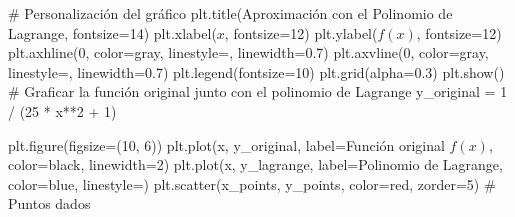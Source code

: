 \documentclass[
  letterpaper,
  DIV=11,
  numbers=noendperiod]{scrartcl}
\newenvironment{Shaded}{\begin{snugshade}}{\end{snugshade}}
\newcommand{\CommentTok}[1]{\textcolor[rgb]{0.37,0.37,0.37}{#1}}
\newcommand{\DecValTok}[1]{\textcolor[rgb]{0.68,0.00,0.00}{#1}}
\newcommand{\FloatTok}[1]{\textcolor[rgb]{0.68,0.00,0.00}{#1}}
\newcommand{\NormalTok}[1]{\textcolor[rgb]{0.00,0.23,0.31}{#1}}
\newcommand{\OperatorTok}[1]{\textcolor[rgb]{0.37,0.37,0.37}{#1}}
\newcommand{\StringTok}[1]{\textcolor[rgb]{0.13,0.47,0.30}{#1}}
\begin{document}
\begin{Shaded}
\begin{Highlighting}[]
\CommentTok{\# Personalización del gráfico}
\NormalTok{plt.title(}\StringTok{\textquotesingle{}Aproximación con el Polinomio de Lagrange\textquotesingle{}}\NormalTok{, fontsize}\OperatorTok{=}\DecValTok{14}\NormalTok{)}
\NormalTok{plt.xlabel(}\StringTok{\textquotesingle{}$x$\textquotesingle{}}\NormalTok{, fontsize}\OperatorTok{=}\DecValTok{12}\NormalTok{)}
\NormalTok{plt.ylabel(}\StringTok{\textquotesingle{}$f(x)$\textquotesingle{}}\NormalTok{, fontsize}\OperatorTok{=}\DecValTok{12}\NormalTok{)}
\NormalTok{plt.axhline(}\DecValTok{0}\NormalTok{, color}\OperatorTok{=}\StringTok{\textquotesingle{}gray\textquotesingle{}}\NormalTok{, linestyle}\OperatorTok{=}\StringTok{\textquotesingle{}{-}{-}\textquotesingle{}}\NormalTok{, linewidth}\OperatorTok{=}\FloatTok{0.7}\NormalTok{)}
\NormalTok{plt.axvline(}\DecValTok{0}\NormalTok{, color}\OperatorTok{=}\StringTok{\textquotesingle{}gray\textquotesingle{}}\NormalTok{, linestyle}\OperatorTok{=}\StringTok{\textquotesingle{}{-}{-}\textquotesingle{}}\NormalTok{, linewidth}\OperatorTok{=}\FloatTok{0.7}\NormalTok{)}
\NormalTok{plt.legend(fontsize}\OperatorTok{=}\DecValTok{10}\NormalTok{)}
\NormalTok{plt.grid(alpha}\OperatorTok{=}\FloatTok{0.3}\NormalTok{)}
\NormalTok{plt.show()}
\CommentTok{\# Graficar la función original junto con el polinomio de Lagrange}
\NormalTok{y\_original }\OperatorTok{=} \DecValTok{1} \OperatorTok{/}\NormalTok{ (}\DecValTok{25} \OperatorTok{*}\NormalTok{ x}\OperatorTok{**}\DecValTok{2} \OperatorTok{+} \DecValTok{1}\NormalTok{)}

\NormalTok{plt.figure(figsize}\OperatorTok{=}\NormalTok{(}\DecValTok{10}\NormalTok{, }\DecValTok{6}\NormalTok{))}
\NormalTok{plt.plot(x, y\_original, label}\OperatorTok{=}\StringTok{\textquotesingle{}Función original $f(x)$\textquotesingle{}}\NormalTok{, color}\OperatorTok{=}\StringTok{\textquotesingle{}black\textquotesingle{}}\NormalTok{, linewidth}\OperatorTok{=}\DecValTok{2}\NormalTok{)}
\NormalTok{plt.plot(x, y\_lagrange, label}\OperatorTok{=}\StringTok{\textquotesingle{}Polinomio de Lagrange\textquotesingle{}}\NormalTok{, color}\OperatorTok{=}\StringTok{\textquotesingle{}blue\textquotesingle{}}\NormalTok{, linestyle}\OperatorTok{=}\StringTok{\textquotesingle{}{-}{-}\textquotesingle{}}\NormalTok{)}
\NormalTok{plt.scatter(x\_points, y\_points, color}\OperatorTok{=}\StringTok{\textquotesingle{}red\textquotesingle{}}\NormalTok{, zorder}\OperatorTok{=}\DecValTok{5}\NormalTok{)  }\CommentTok{\# Puntos dados}


\end{Highlighting}
\end{Shaded}
\end{document}
